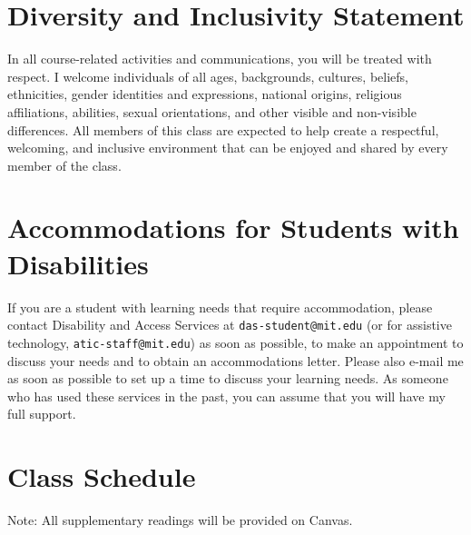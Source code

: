 \documentclass[letterpaper]{infinity_syllabus} %
\begin{document}
\vspace{0.5cm}
\section{Diversity and Inclusivity Statement}

In all course-related activities and communications, you will be treated with respect.
I welcome individuals of all ages, backgrounds, cultures, beliefs, ethnicities, gender identities and expressions, national origins, religious affiliations, abilities, sexual orientations, and other visible and non-visible differences.
All members of this class are expected to help create a respectful, welcoming, and inclusive environment that can be enjoyed and shared by every member of the class.

\vspace{0.5cm}
\section{Accommodations for Students with Disabilities}

If you are a student with learning needs that require accommodation, please contact Disability and Access Services at \texttt{das-student@mit.edu} (or for assistive technology, \texttt{atic-staff@mit.edu}) as soon as possible, to make an appointment to discuss your needs and to obtain an accommodations letter.
Please also e-mail me as soon as possible to set up a time to discuss your learning needs.
As someone who has used these services in the past, you can assume that you will have my full support.


\newpage
\makeFullPage
\section{Class Schedule}
  \vspace{.2in}

Note: All supplementary readings will be provided on Canvas.\\
\end{document}
